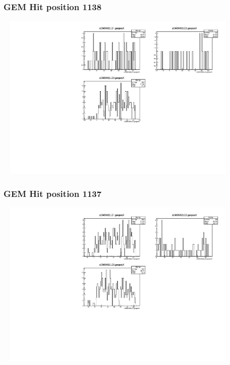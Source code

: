\documentclass[slidestop,compress,mathserif]{beamer}
\begin{document}
\begin{frame}\frametitle{GEM Hit position 1138}
	 \includegraphics[width=12cm,height=8cm]{GEM_Hit_position_1138.pdf}
\end{frame}
\begin{frame}\frametitle{GEM Hit position 1137}
	 \includegraphics[width=12cm,height=8cm]{GEM_Hit_position_1137.pdf}
\end{frame}
\end{document}
